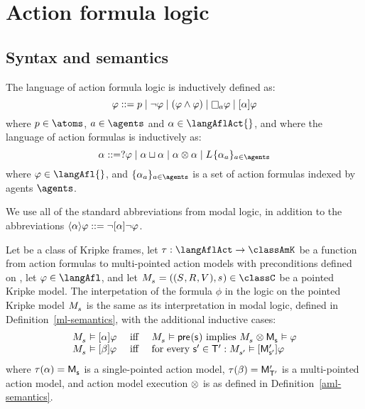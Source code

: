 \chapter{Action formula logic}

\section{Syntax and semantics}

\begin{definition}
The language \langAfl{} of action formula logic is inductively defined as:
$$
\phi ::= \atomP \mid 
       \neg \phi \mid
       (\phi \land \phi) \mid
       \necessaryA \phi \mid
       \actionA{\alpha} \phi
$$
where $\atomP \in \atoms$, $\agentA \in \agents$ and $\alpha \in \langAflAct{}$, and where the language \langAflAct{} of action formulas is inductively as:
$$
\alpha ::= \test{\phi} \mid
       \alpha \choice \alpha \mid
       \alpha \compose \alpha \mid
       \learns \{\alpha_\agentA\}_{\agentA \in \agents}
$$
where $\phi \in \langAfl{}$, and $\{\alpha_\agentA\}_{\agentA \in \agents}$ is a set of action formulas indexed by agents $\agents$.
\end{definition}

We use all of the standard abbreviations from modal logic, in addition to the abbreviations ${\langle {\alpha} \rangle} \varphi ::= \lnot {[ {\alpha} ]} \lnot \varphi$.

\begin{definition}
Let \classC{} be a class of Kripke frames, let $\tau : \langAflAct \to \classAmK$ be a function from action formulas to multi-pointed action models with preconditions defined on \langAfl{}, let $\phi \in \langAfl$, and let $\kPModelAndTuple{\kStateS} \in \classC$ be a pointed Kripke model.
The interpetation of the formula $\phi$ in the logic \logicAflC{} on the pointed Kripke model $\kPModel{\kStateS}$ is the same as its interpretation in modal logic, defined in Definition~\ref{ml-semantics}, with the additional inductive cases:
$$
\begin{array}{lcl}
    \kPModel{\kStateS} \entails \actionA{\alpha} \phi & \text { iff } & \kPModel{\kStateS} \entails \aPrecondition(\aStateS) \text{ implies } \kPModel{\kStateS} \exec \aPModel{\aStateS} \entails \phi\\
    \kPModel{\kStateS} \entails \actionA{\beta} \phi & \text { iff } & \text{for every } \aStateSP \in \aStatesTP: \kPModel{\kStateSP} \entails \actionA{\aPModelP{\aStateSP}} \phi
\end{array}
$$
where $\tau(\alpha) = \aPModel{\aStateS}$ is a single-pointed action model, $\tau(\beta) = {\mathsf{M}^{\prime}_{{\mathsf{{T}}^{\prime}}}}$ is a multi-pointed action model, and action model execution $\otimes$ is as defined in Definition~\ref{aml-semantics}.
\end{definition}

